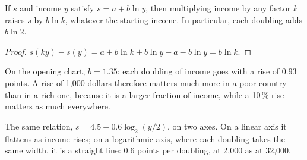 \begin{proposition}\label{prop:g12:income-and-wellbeing:doubling}
If  $s$ and income $y$ satisfy $s = a + b \ln y$, then multiplying income by any factor $k$ raises $s$ by $b \ln k$, whatever the starting income. In
particular, each doubling adds $b \ln 2$.
\end{proposition}
\begin{proof}
$s(ky) - s(y) = a + b \ln k + b \ln y - a - b \ln y = b \ln k$.
\end{proof}

On the opening chart, $b = 1.35$: each doubling of income goes with a rise of 0.93 points. A rise of 1,000 dollars therefore matters much more in a poor country than in a rich
one, because it is a larger fraction of income, while a 10\,\% rise matters as much everywhere.

\begin{omfigure}

{\small The same relation, $s = 4.5 + 0.6 \log_2(y/2)$, on two axes. On a linear axis it flattens as income rises; on a logarithmic axis, where each doubling takes the same
width, it is a straight line: 0.6 points per doubling, at 2,000 as at 32,000.}
\end{omfigure}

